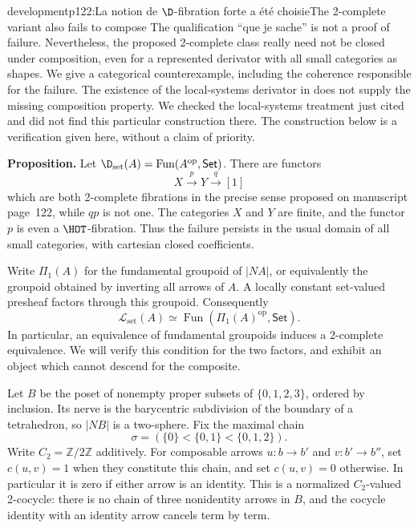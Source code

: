 \begin{dcomment}{development}{p122:La notion de $\D$-fibration forte a été choisie}{The 2-complete variant also fails to compose}
The qualification ``que je sache'' is not a proof of failure. Nevertheless, the proposed 2-complete class really need not be closed under composition, even for a represented derivator with all small categories as shapes. We give a categorical counterexample, including the coherence responsible for the failure. The existence of the local-systems derivator in \citet[Theorem~3.13]{Cisinski2009LocallyConstant} does not supply the missing composition property. We checked the local-systems treatment just cited and did not find this particular construction there. The construction below is a verification given here, without a claim of priority.

\textbf{Proposition.}\ours\quad
Let $\D_{\mathrm{set}}(A)=\operatorname{Fun}(A^{\mathrm{op}},\mathsf{Set})$. There are functors
\[
 X\xrightarrow{p}Y\xrightarrow{q}[1]
\]
which are both 2-complete fibrations in the precise sense proposed on manuscript page~122, while $qp$ is not one. The categories $X$ and $Y$ are finite, and the functor $p$ is even a $\HOT$-fibration. Thus the failure persists in the usual domain of all small categories, with cartesian closed coefficients.

Write $\Pi_1(A)$ for the fundamental groupoid of $|NA|$, or equivalently the groupoid obtained by inverting all arrows of $A$. A locally constant set-valued presheaf factors through this groupoid. Consequently
\[
 \mathcal L_{\mathrm{set}}(A)
 \simeq\operatorname{Fun}(\Pi_1(A)^{\mathrm{op}},\mathsf{Set}).
\]
In particular, an equivalence of fundamental groupoids induces a 2-complete equivalence. We will verify this condition for the two factors, and exhibit an object which cannot descend for the composite.

Let $B$ be the poset of nonempty proper subsets of $\{0,1,2,3\}$, ordered by inclusion. Its nerve is the barycentric subdivision of the boundary of a tetrahedron, so $|NB|$ is a two-sphere. Fix the maximal chain
\[
 \sigma=(\{0\}<\{0,1\}<\{0,1,2\}).
\]
Write $C_2=\mathbb Z/2\mathbb Z$ additively. For composable arrows $u:b\to b'$ and $v:b'\to b''$, set $c(u,v)=1$ when they constitute this chain, and set $c(u,v)=0$ otherwise. In particular it is zero if either arrow is an identity. This is a normalized $C_2$-valued 2-cocycle: there is no chain of three nonidentity arrows in $B$, and the cocycle identity with an identity arrow cancels term by term.


\end{dcomment}

